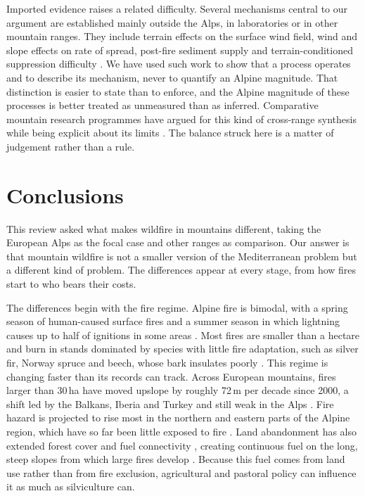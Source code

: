 \documentclass[11pt,a4paper]{article}
\begin{document}
Imported evidence raises a related difficulty. Several mechanisms central to our argument are established mainly outside the Alps, in laboratories or in other mountain ranges. They include terrain effects on the surface wind field, wind and slope effects on rate of spread, post-fire sediment supply and terrain-conditioned suppression difficulty \citep{sharples_overview_2009, hayajneh_wind_2026, morell_sediment_2021, cardil_assessing_2025}. We have used such work to show that a process operates and to describe its mechanism, never to quantify an Alpine magnitude. That distinction is easier to state than to enforce, and the Alpine magnitude of these processes is better treated as unmeasured than as inferred. Comparative mountain research programmes have argued for this kind of cross-range synthesis while being explicit about its limits \citep{payne_nature_2020}. The balance struck here is a matter of judgement rather than a rule.

\section{Conclusions}
\label{sec:conclusions}

This review asked what makes wildfire in mountains different, taking the European Alps as the focal case and other ranges as comparison. Our answer is that mountain wildfire is not a smaller version of the Mediterranean problem but a different kind of problem. The differences appear at every stage, from how fires start to who bears their costs.

The differences begin with the fire regime. Alpine fire is bimodal, with a spring season of human-caused surface fires and a summer season in which lightning causes up to half of ignitions in some areas \citep{valese_wildfires_2011, muller_forest_2020}. Most fires are smaller than a hectare \citep{muller_forest_2020} and burn in stands dominated by species with little fire adaptation, such as silver fir, Norway spruce and beech, whose bark insulates poorly \citep{dupire_vulnerability_2019, mutterer_bark_2026}. This regime is changing faster than its records can track. Across European mountains, fires larger than 30\,ha have moved upslope by roughly 72\,m per decade since 2000, a shift led by the Balkans, Iberia and Turkey and still weak in the Alps \citep{beloiu_climatedriven_2026}. Fire hazard is projected to rise most in the northern and eastern parts of the Alpine region, which have so far been little exposed to fire \citep{gerberding_mapping_2025}. Land abandonment has also extended forest cover and fuel connectivity \citep{gerberding_mapping_2025}, creating continuous fuel on the long, steep slopes from which large fires develop \citep{conedera_linking_2024}. Because this fuel comes from land use rather than from fire exclusion, agricultural and pastoral policy can influence it as much as silviculture can.
\end{document}
